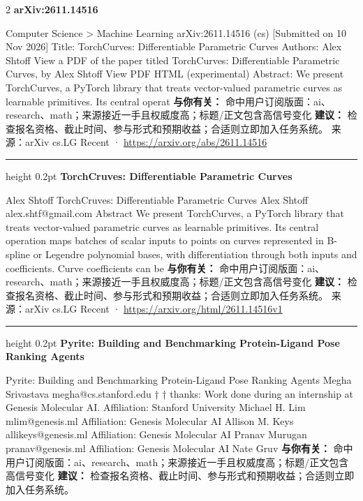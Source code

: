 \documentclass[10.5pt]{ctexart}
\begin{document}
\begin{multicols}{2}
{\large\bfseries arXiv:2611.14516}\par
Computer Science > Machine Learning arXiv:2611.14516 (cs) [Submitted on 10 Nov 2026] Title: TorchCurves: Differentiable Parametric Curves Authors: Alex Shtoff View a PDF of the paper titled TorchCurves: Differentiable Parametric Curves, by Alex Shtoff View PDF HTML (experimental) Abstract: We present TorchCurves, a PyTorch library that treats vector-valued parametric curves as learnable primitives. Its central operat
\textbf{与你有关：} 命中用户订阅版面：ai、research、math；来源接近一手且权威度高；标题/正文包含高信号变化
\textbf{建议：} 检查报名资格、截止时间、参与形式和预期收益；合适则立即加入任务系统。
{\footnotesize\color{ormuted} 来源：arXiv cs.LG Recent · \url{https://arxiv.org/abs/2611.14516}}
\vspace{2mm}
\hrule height 0.2pt
\vspace{2mm}
{\large\bfseries TorchCruves: Differentiable Parametric Curves}\par
Alex Shtoff TorchCruves: Differentiable Parametric Curves Alex Shtoff alex.shtf@gmail.com Abstract We present TorchCurves, a PyTorch library that treats vector-valued parametric curves as learnable primitives. Its central operation maps batches of scalar inputs to points on curves represented in B-spline or Legendre polynomial bases, with differentiation through both inputs and coefficients. Curve coefficients can be
\textbf{与你有关：} 命中用户订阅版面：ai、research、math；来源接近一手且权威度高；标题/正文包含高信号变化
\textbf{建议：} 检查报名资格、截止时间、参与形式和预期收益；合适则立即加入任务系统。
{\footnotesize\color{ormuted} 来源：arXiv cs.LG Recent · \url{https://arxiv.org/html/2611.14516v1}}
\vspace{2mm}
\hrule height 0.2pt
\vspace{2mm}
{\large\bfseries Pyrite: Building and Benchmarking Protein-Ligand Pose Ranking Agents}\par
Pyrite: Building and Benchmarking Protein-Ligand Pose Ranking Agents Megha Srivastava megha@cs.stanford.edu † † thanks: Work done during an internship at Genesis Molecular AI. Affiliation: Stanford University Michael H. Lim mlim@genesis.ml Affiliation: Genesis Molecular AI Allison M. Keys allikeys@genesis.ml Affiliation: Genesis Molecular AI Pranav Murugan pranav@genesis.ml Affiliation: Genesis Molecular AI Nate Gruv
\textbf{与你有关：} 命中用户订阅版面：ai、research、math；来源接近一手且权威度高；标题/正文包含高信号变化
\textbf{建议：} 检查报名资格、截止时间、参与形式和预期收益；合适则立即加入任务系统。

\end{multicols}
\end{document}
